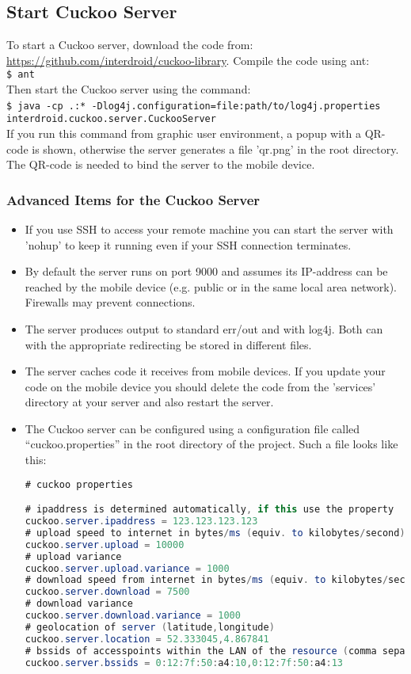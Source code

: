 \documentclass{article}
\begin{document}
\subsection{Start Cuckoo Server}
To start a Cuckoo server, download the code from:
\url{https://github.com/interdroid/cuckoo-library}. Compile the code using ant:
\\
\verb!$ ant!\\
Then start the Cuckoo server using the command:\\
\verb!$ java -cp .:* -Dlog4j.configuration=file:path/to/log4j.properties!
\verb!  interdroid.cuckoo.server.CuckooServer! \\
If you run this command from graphic user environment, a popup with a QR-code is
shown, otherwise the server generates a file 'qr.png' in the root directory. The
QR-code is needed to bind the server to the mobile device.

\subsubsection{Advanced Items for the Cuckoo Server}
\begin{itemize}
  \item If you use SSH to access your remote machine you can start the server with
'nohup' to keep it running even if your SSH connection terminates.
\item By default the server runs on port 9000 and assumes its IP-address can be
reached by the mobile device (e.g. public or in the same local area network).
Firewalls may prevent connections. 
\item The server produces output to standard err/out and with log4j. Both can
with the appropriate redirecting be stored in different files.
\item The server caches code it receives from mobile devices. If you update your
code on the mobile device you should delete the code from the 'services'
directory at your server and also restart the server.
\item The Cuckoo server can be configured using a configuration file called
``cuckoo.properties'' in the root directory of the project. Such a file looks
like this:\\

\begin{lstlisting}[language=java]
# cuckoo properties

# ipaddress is determined automatically, if this use the property
cuckoo.server.ipaddress = 123.123.123.123
# upload speed to internet in bytes/ms (equiv. to kilobytes/second)
cuckoo.server.upload = 10000
# upload variance
cuckoo.server.upload.variance = 1000
# download speed from internet in bytes/ms (equiv. to kilobytes/second)
cuckoo.server.download = 7500
# download variance
cuckoo.server.download.variance = 1000
# geolocation of server (latitude,longitude)
cuckoo.server.location = 52.333045,4.867841
# bssids of accesspoints within the LAN of the resource (comma separated list)
cuckoo.server.bssids = 0:12:7f:50:a4:10,0:12:7f:50:a4:13

\end{lstlisting}
\end{itemize}
\end{document}
